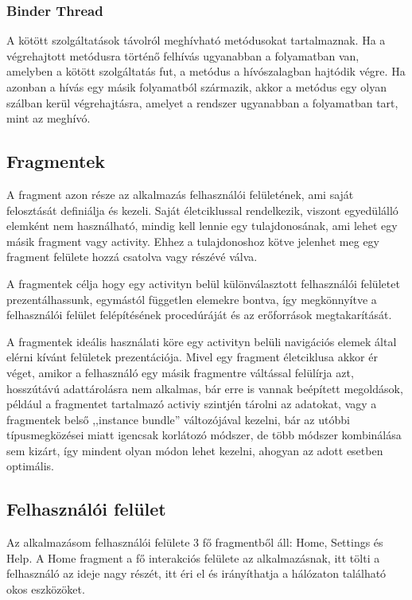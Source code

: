 \documentclass[]{thesis-ekf}
\theoremstyle{definition}
\theoremstyle{remark}
\begin{document}
\subsubsection{Binder Thread}
A kötött szolgáltatások távolról meghívható metódusokat tartalmaznak. Ha a végrehajtott metódusra történő felhívás ugyanabban a folyamatban van, amelyben a kötött szolgáltatás fut, a metódus a hívószalagban hajtódik végre. Ha azonban a hívás egy másik folyamatból származik, akkor a metódus egy olyan szálban kerül végrehajtásra, amelyet a rendszer ugyanabban a folyamatban tart, mint az meghívó.

\subsection{Fragmentek}
A fragment azon része az alkalmazás felhasználói felületének, ami saját felosztását definiálja és kezeli. Saját életciklussal
rendelkezik, viszont egyedülálló elemként nem használható, mindig kell lennie egy tulajdonosának, ami lehet egy másik
fragment vagy activity. Ehhez a tulajdonoshoz kötve jelenhet meg egy fragment felülete hozzá csatolva vagy részévé válva.

A fragmentek célja hogy egy activityn belül különválasztott felhasználói felületet prezentálhassunk, egymástól független
elemekre bontva, így megkönnyítve a felhasználói felület felépítésének procedúráját és az erőforrások megtakarítását.

A fragmentek ideális használati köre egy activityn belüli navigációs elemek által elérni kívánt felületek prezentációja. Mivel egy fragment életciklusa akkor ér véget, amikor a felhasználó egy másik fragmentre váltással felülírja azt, hosszútávú
adattárolásra nem alkalmas, bár erre is vannak beépített megoldások, például a fragmentet tartalmazó activiy szintjén tárolni
az adatokat, vagy a fragmentek belső ,,instance bundle'' változójával kezelni, bár az utóbbi típusmegközései miatt igencsak
korlátozó módszer, de több módszer kombinálása sem kizárt, így mindent olyan módon lehet kezelni, ahogyan az adott esetben optimális.
\subsection{Felhasználói felület}
Az alkalmazásom felhasználói felülete 3 fő fragmentből áll: Home, Settings és Help. A Home fragment a fő interakciós felülete
az alkalmazásnak, itt tölti a felhasználó az ideje nagy részét, itt éri el és irányíthatja a hálózaton található okos eszközöket.
\end{document}
